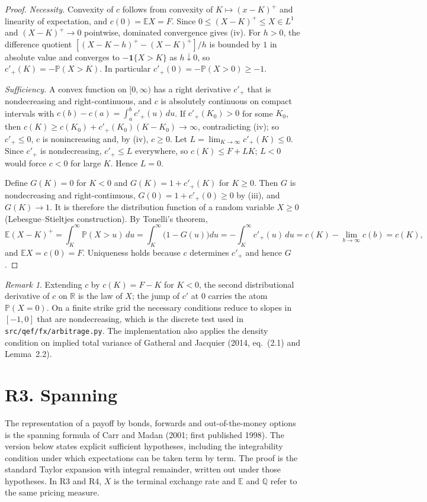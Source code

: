 \documentclass[11pt]{article}
\theoremstyle{remark}
\newtheorem{remark}[proposition]{Remark}
\newcommand{\E}{\mathbb{E}}
\newcommand{\Q}{\mathbb{Q}}
\renewcommand{\P}{\mathbb{P}}
\begin{document}
\begin{proof}
\emph{Necessity.} Convexity of $c$ follows from convexity of $K\mapsto(x-K)^+$ and linearity of expectation, and $c(0)=\E X=F$. Since $0\le(X-K)^+\le X\in L^1$ and $(X-K)^+\to0$ pointwise, dominated convergence gives (iv). For $h>0$, the difference quotient $[(X-K-h)^+-(X-K)^+]/h$ is bounded by $1$ in absolute value and converges to $-\mathbf 1\{X>K\}$ as $h\downarrow0$, so $c'_+(K)=-\P(X>K)$. In particular $c'_+(0)=-\P(X>0)\ge-1$.

\emph{Sufficiency.} A convex function on $[0,\infty)$ has a right derivative $c'_+$ that is nondecreasing and right-continuous, and $c$ is absolutely continuous on compact intervals with $c(b)-c(a)=\int_a^b c'_+(u)\,du$. If $c'_+(K_0)>0$ for some $K_0$, then $c(K)\ge c(K_0)+c'_+(K_0)(K-K_0)\to\infty$, contradicting (iv); so $c'_+\le0$, $c$ is nonincreasing and, by (iv), $c\ge0$. Let $L=\lim_{K\to\infty}c'_+(K)\le0$. Since $c'_+$ is nondecreasing, $c'_+\le L$ everywhere, so $c(K)\le F+LK$; $L<0$ would force $c<0$ for large $K$. Hence $L=0$.

Define $G(K)=0$ for $K<0$ and $G(K)=1+c'_+(K)$ for $K\ge0$. Then $G$ is nondecreasing and right-continuous, $G(0)=1+c'_+(0)\ge0$ by (iii), and $G(K)\to1$. It is therefore the distribution function of a random variable $X\ge0$ (Lebesgue--Stieltjes construction). By Tonelli's theorem,
\[
\E(X-K)^+=\int_K^\infty \P(X>u)\,du=\int_K^\infty\bigl(1-G(u)\bigr)du=-\int_K^\infty c'_+(u)\,du=c(K)-\lim_{b\to\infty}c(b)=c(K),
\]
and $\E X=c(0)=F$. Uniqueness holds because $c$ determines $c'_+$ and hence $G$.
\end{proof}

\begin{remark}
Extending $c$ by $c(K)=F-K$ for $K<0$, the second distributional derivative of $c$ on $\mathbb{R}$ is the law of $X$; the jump of $c'$ at $0$ carries the atom $\P(X=0)$. On a finite strike grid the necessary conditions reduce to slopes in $[-1,0]$ that are nondecreasing, which is the discrete test used in \texttt{src/qef/fx/arbitrage.py}. The implementation also applies the density condition on implied total variance of Gatheral and Jacquier (2014, eq.~(2.1) and Lemma~2.2).
\end{remark}

\section*{R3. Spanning}

The representation of a payoff by bonds, forwards and out-of-the-money options is the spanning formula of Carr and Madan (2001; first published 1998). The version below states explicit sufficient hypotheses, including the integrability condition under which expectations can be taken term by term. The proof is the standard Taylor expansion with integral remainder, written out under those hypotheses. In R3 and R4, $X$ is the terminal exchange rate and $\E$ and $\Q$ refer to the same pricing measure.
\end{document}
